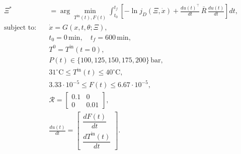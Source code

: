 \documentclass[../Article_Design_of_Experiment.tex]{subfiles}
\begin{document}
	{\footnotesize 
		\begin{equation}
			\begin{aligned}
				\Xi^* &= \arg \min_{T^{\text{in}}(t), F(t)} 
				\int_{t_0}^{t_f} \left[ - \ln j_D(\Xi, \dot{x}) + 
				\frac{du(t)^\top}{dt} \, \bar{R} \, \frac{du(t)}{dt} \right] dt, \\
				\text{subject to:} \quad 
				& \dot{x} = G(x, t, \theta; \Xi), \\
				& t_0 = 0 \, \text{min}, \quad t_f = 600 \, \text{min}, \\
				& T^0 = T^{\text{in}}(t=0), \\
				& P(t) \in \{100, 125, 150, 175, 200\} \, \text{bar}, \\
				& 31^\circ\text{C} \leq T^{\text{in}}(t) \leq 40^\circ\text{C}, \\
				& 3.33 \cdot 10^{-5} \leq F(t) \leq 6.67 \cdot 10^{-5}, \\
				& \mathcal{R} = 
				\begin{bmatrix} 
					0.1 & 0 \\ 
					0 & 0.01 
				\end{bmatrix}, \\
				& \frac{du(t)}{dt} = 
				\begin{bmatrix} 
					\dfrac{dF(t)}{dt} \\ 
					\dfrac{dT^{\text{in}}(t)}{dt} 
				\end{bmatrix}.
			\end{aligned}
			\label{EQ:Formulation_2}
			\end{equation} }
	
\end{document}
